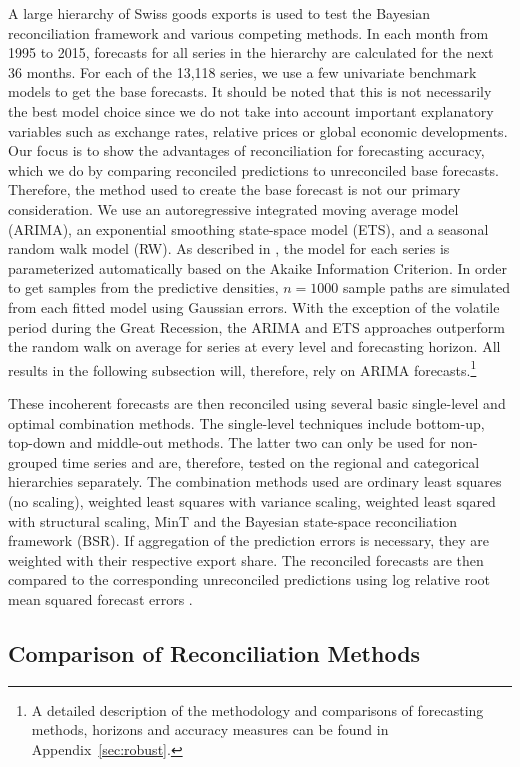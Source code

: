 \documentclass[a4paper,fleqn,11pt]{article}
\begin{document}
A large hierarchy of Swiss goods exports is used to test the Bayesian reconciliation framework and various competing methods. In each month from 1995 to 2015, forecasts for all series in the hierarchy are calculated for the next 36 months. For each of the 13,118 series, we use a few univariate benchmark models to get the base forecasts. It should be noted that this is not necessarily the best model choice since we do not take into account important explanatory variables such as exchange rates, relative prices or global economic developments. Our focus is to show the advantages of reconciliation for forecasting accuracy, which we do by comparing reconciled predictions to unreconciled base forecasts. Therefore, the method used to create the base forecast is not our primary consideration. We use an autoregressive integrated moving average model (ARIMA), an exponential smoothing state-space model (ETS), and a seasonal random walk model (RW). As described in \cite{Hyndman2008}, the model for each series is parameterized automatically based on the Akaike Information Criterion. In order to get samples from the predictive densities, $n = 1000$ sample paths are simulated from each fitted model using Gaussian errors. With the exception of the volatile period during the Great Recession, the ARIMA and ETS approaches outperform the random walk on average for series at every level and forecasting horizon. All results in the following subsection will, therefore, rely on ARIMA forecasts.\footnote{A detailed description of the methodology and comparisons of forecasting methods, horizons and accuracy measures can be found in Appendix~\ref{sec:robust}.}

These incoherent forecasts are then reconciled using several basic single-level and optimal combination methods. The single-level techniques include bottom-up, top-down and middle-out methods. The latter two can only be used for non-grouped time series and are, therefore, tested on the regional and categorical hierarchies separately. The combination methods used are ordinary least squares (no scaling), weighted least squares with variance scaling, weighted least sqared with structural scaling, MinT and the Bayesian state-space reconciliation framework (BSR). If aggregation of the prediction errors is necessary, they are weighted with their respective export share. The reconciled forecasts are then compared to the corresponding unreconciled predictions using log relative root mean squared forecast errors \citep{Hyndman2006}.


\subsection{Comparison of Reconciliation Methods}\label{sec:comp}
\end{document}
